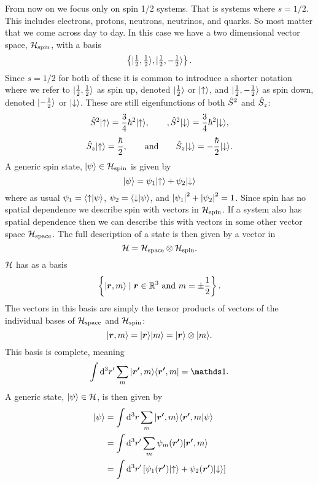 From now on we focus only on spin 1/2 systems.
That is systems where \(s = 1/2\).
This includes electrons, protons, neutrons, neutrinos, and quarks.
So most matter that we come across day to day.
In this case we have a two dimensional vector space, \(\mathcal{H}_{\text{spin}}\), with a basis
\[\left\{\vert {\tfrac{1}{2}, \tfrac{1}{2}} \rangle, \vert {\tfrac{1}{2}, -\tfrac{1}{2}} \rangle\right\}.\]
Since \(s = 1/2\) for both of these it is common to introduce a shorter notation where we refer to \(\vert {\tfrac{1}{2}, \tfrac{1}{2}} \rangle\) as spin up, denoted \(\vert {\tfrac{1}{2}} \rangle\) or \(\vert {\uparrow} \rangle\), and \(\vert {\tfrac{1}{2}, -\tfrac{1}{2}} \rangle\) as spin down, denoted \(\vert {-\tfrac{1}{2}} \rangle\) or \(\vert {\downarrow} \rangle\).
These are still eigenfunctions of both \(\hat{S}^2\) and \(\hat{S}_z\):
\[\hat{S}^2\vert {\uparrow} \rangle = \frac{3}{4}\hbar^2\vert {\uparrow} \rangle, \qquad, \hat{S}^2\vert {\downarrow} \rangle = \frac{3}{4}\hbar^2\vert {\downarrow} \rangle,\]
\[\hat{S}_z\vert {\uparrow} \rangle = \frac{\hbar}{2}, \qquad\text{and}\qquad \hat{S}_z\vert {\downarrow} \rangle = -\frac{\hbar}{2}\vert {\downarrow} \rangle.\]
A generic spin state, \(\vert {\psi} \rangle\in\mathcal{H}_\text{spin}\) is given by
\[\vert {\psi} \rangle = \psi_1\vert {\uparrow} \rangle + \psi_2\vert {\downarrow} \rangle\]
where as usual \(\psi_1 = \langle {\uparrow} \vert {\psi} \rangle\), \(\psi_2 = \langle {\downarrow} \vert {\psi} \rangle\), and \(\abs{\psi_1}^2 + \abs{\psi_2}^2 = 1\).
Since spin has no spatial dependence we describe spin with vectors in \(\mathcal{H}_\text{spin}\).
If a system also has spatial dependence then we can describe this with vectors in some other vector space \(\mathcal{H}_\text{space}\).
The full description of a state is then given by a vector in
\[\mathcal{H} = \mathcal{H}_\text{space}\otimes\mathcal{H}_\text{spin}.\]
\(\mathcal{H}\) has as a basis
\[\left\{ \vert {\bm{r}, m} \rangle\mid \bm{r}\in\mathbb{R}^3 ~\text{and}~ m = \pm\frac{1}{2} \right\}.\]
The vectors in this basis are simply the tensor products of vectors of the individual bases of \(\mathcal{H}_\text{space}\) and \(\mathcal{H}_\text{spin}\):
\[\vert {\bm{r}, m} \rangle = \vert {\bm{r}} \rangle\vert {m} \rangle = \vert {\bm{r}} \rangle\otimes\vert {m} \rangle.\]
This basis is complete, meaning
\[\int \dd[3]{r'} \sum_{m} \ketbra{\vv{r'}, m}{\vv{r'}, m} = \ident.\]
A generic state, \(\vert {\psi} \rangle\in\mathcal{H}\), is then given by
\begin{align*}
    \vert {\psi} \rangle &= \int\dd[3]{r} \sum_m \vert {\bm{r'}, m} \rangle\langle {\bm{r'}, m} \vert {\psi} \rangle\\
    &= \int\dd[3]{r'}\sum_m \psi_m(\bm{r'})\vert {\bm{r'}, m} \rangle\\
    &= \int\dd[3]{r'}\left[\psi_1(\bm{r'})\vert {\uparrow} \rangle + \psi_2(\bm{r'})\vert {\downarrow} \rangle\right]
\end{align*}
